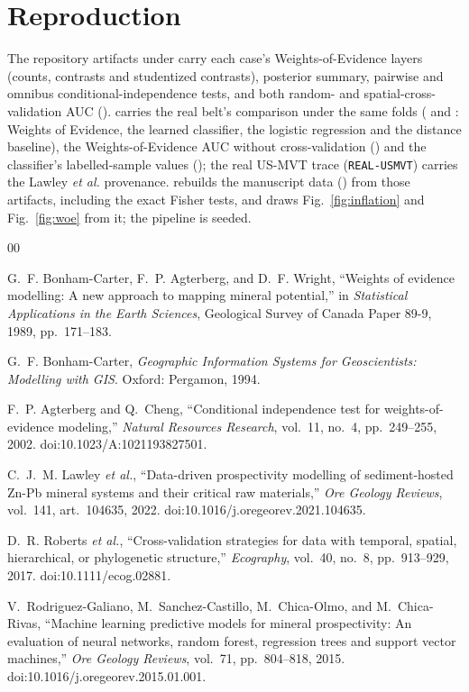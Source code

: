 \documentclass[journal]{IEEEtran}
\begin{document}
\appendices
\section{Reproduction}\label{app:repro}

{\raggedright\setlength{\parindent}{1em}
The repository artifacts under  carry each case's Weights-of-Evidence layers (counts,
contrasts and studentized contrasts), posterior summary, pairwise and omnibus conditional-independence tests, and
both random- and spatial-cross-validation AUC ().  carries the
real belt's comparison under the same folds ( and : Weights of Evidence, the
learned classifier, the logistic regression and the distance baseline), the Weights-of-Evidence AUC without
cross-validation () and the classifier's labelled-sample values (); the real
US-MVT trace (\texttt{REAL-USMVT}) carries the Lawley \emph{et al.} provenance.
 rebuilds the manuscript data () from those
artifacts, including the exact Fisher tests, and  draws Fig.~\ref{fig:inflation} and
Fig.~\ref{fig:woe} from it; the pipeline is seeded.\par}

\balance

\begin{thebibliography}{00}

 G.~F. Bonham-Carter, F.~P. Agterberg, and D.~F. Wright, ``Weights of evidence modelling: A new
approach to mapping mineral potential,'' in \emph{Statistical Applications in the Earth Sciences}, Geological
Survey of Canada Paper 89-9, 1989, pp.~171--183.

 G.~F. Bonham-Carter, \emph{Geographic Information Systems for Geoscientists: Modelling with
GIS}. Oxford: Pergamon, 1994.

 F.~P. Agterberg and Q.~Cheng, ``Conditional independence test for weights-of-evidence
modeling,'' \emph{Natural Resources Research}, vol.~11, no.~4, pp.~249--255, 2002.
doi:10.1023/A:1021193827501.

 C.~J.~M. Lawley \emph{et al.}, ``Data-driven prospectivity modelling of sediment-hosted Zn-Pb
mineral systems and their critical raw materials,'' \emph{Ore Geology Reviews}, vol.~141, art.~104635, 2022.
doi:10.1016/j.oregeorev.2021.104635.

 D.~R. Roberts \emph{et al.}, ``Cross-validation strategies for data with temporal, spatial,
hierarchical, or phylogenetic structure,'' \emph{Ecography}, vol.~40, no.~8, pp.~913--929, 2017.
doi:10.1111/ecog.02881.

 V.~Rodriguez-Galiano, M.~Sanchez-Castillo, M.~Chica-Olmo, and M.~Chica-Rivas, ``Machine
learning predictive models for mineral prospectivity: An evaluation of neural networks, random forest, regression
trees and support vector machines,'' \emph{Ore Geology Reviews}, vol.~71, pp.~804--818, 2015.
doi:10.1016/j.oregeorev.2015.01.001.

\end{thebibliography}
\end{document}
